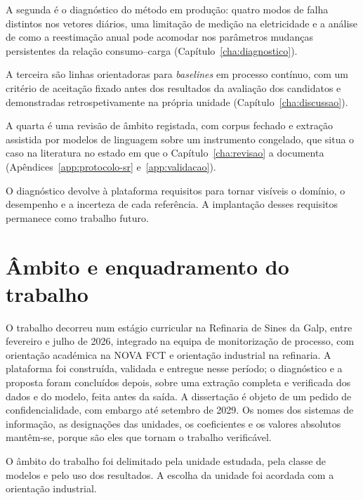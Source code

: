 A segunda é o diagnóstico do método em produção: quatro modos de falha
distintos nos vetores diários, uma limitação de medição na eletricidade
e a análise de como a reestimação anual pode acomodar nos
parâmetros mudanças persistentes da relação consumo--carga
(Capítulo~\ref{cha:diagnostico}).

A terceira são linhas orientadoras para \emph{baselines} em processo
contínuo, com um critério de aceitação fixado antes dos
resultados da avaliação dos candidatos e demonstradas retrospetivamente
na própria unidade
(Capítulo~\ref{cha:discussao}).

A quarta é uma revisão de âmbito registada, com corpus fechado e
extração assistida por modelos de linguagem sobre um instrumento
congelado, que situa o caso na literatura no estado em que o
Capítulo~\ref{cha:revisao} a documenta
(Apêndices~\ref{app:protocolo-sr} e~\ref{app:validacao}).

 O diagnóstico devolve à plataforma requisitos para tornar
visíveis o domínio, o desempenho e a incerteza de cada referência. A
implantação desses requisitos permanece como trabalho futuro.

\section{Âmbito e enquadramento do trabalho}
\label{sec:ambito}

O trabalho decorreu num estágio curricular na Refinaria de Sines da
Galp, entre fevereiro e julho de 2026, integrado na equipa de
monitorização de processo, com orientação académica na NOVA FCT e
orientação industrial na refinaria. A
plataforma foi construída, validada e entregue nesse período; o
diagnóstico e a proposta foram concluídos depois, sobre uma extração
completa e verificada dos dados e do modelo, feita antes da saída. A
dissertação é objeto de um pedido de confidencialidade, com embargo até
setembro de 2029. Os nomes dos sistemas de informação, as designações
das unidades, os coeficientes e os valores absolutos mantêm-se, porque
são eles que tornam o trabalho verificável.

O âmbito do trabalho foi delimitado pela unidade estudada, pela
classe de modelos e pelo uso dos resultados. A escolha da unidade foi
acordada com a orientação industrial.

